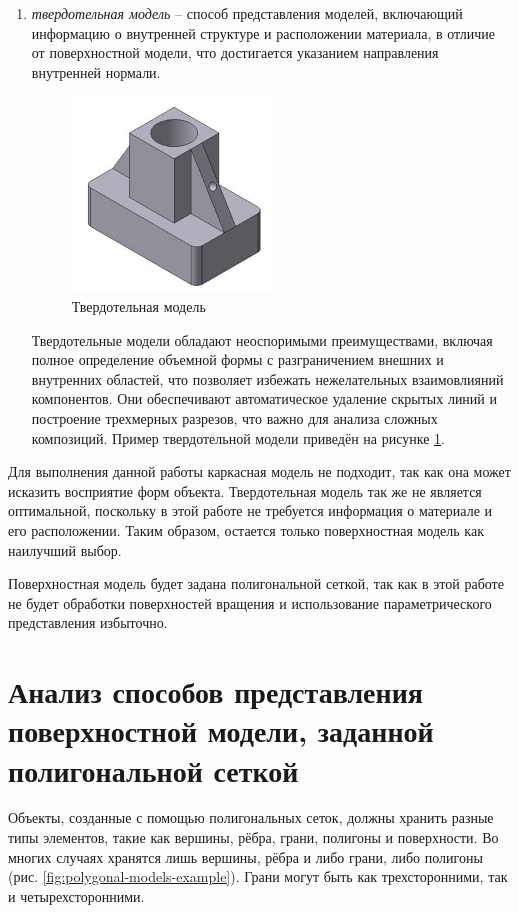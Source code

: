 \begin{enumerate}
	\item \textit{твердотельная модель} -- способ представления моделей, включающий информацию о внутренней структуре и расположении материала, в отличие от поверхностной модели, что достигается указанием направления внутренней нормали.
	\begin{figure}[h] 
		\centering
		\includegraphics[width=0.5\textwidth]{images/solidum-statu-models.png}
		\caption{Твердотельная модель} 
		\label{fig:solidum-statu-models} 
	\end{figure}
	Твердотельные модели обладают неоспоримыми преимуществами, включая полное определение объемной формы с разграничением внешних и внутренних областей, что позволяет избежать нежелательных взаимовлияний компонентов. Они обеспечивают автоматическое удаление скрытых линий и построение трехмерных разрезов, что важно для анализа сложных композиций. Пример твердотельной модели приведён на рисунке \ref{fig:solidum-statu-models}.
\end{enumerate}
	
Для выполнения данной работы каркасная модель не подходит, так как она может исказить восприятие форм объекта. Твердотельная модель так же не является оптимальной, поскольку в этой работе не требуется информация о материале и его расположении. Таким образом, остается только поверхностная модель как наилучший выбор. 

Поверхностная модель будет задана полигональной сеткой, так как в этой работе не будет обработки поверхностей вращения и использование параметрического представления избыточно.

\section{Анализ способов представления поверхностной модели, заданной полигональной сеткой}

Объекты, созданные с помощью полигональных сеток, должны хранить разные типы элементов, такие как вершины, рёбра, грани, полигоны и поверхности. Во многих случаях хранятся лишь вершины, рёбра и либо грани, либо полигоны (рис. \ref{fig:polygonal-models-example}). Грани могут быть как трехсторонними, так и четырехсторонними.

